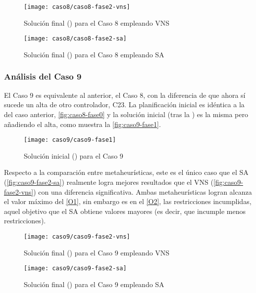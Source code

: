 \begin{figure}[!]
	\centering
	\texttt{[image: caso8/caso8-fase2-vns]}
	\caption{Solución final (\fasedos{}) para el Caso 8 empleando VNS}
	\label{fig:caso8-fase2-vns}
\end{figure}

\begin{figure}[!]
	\centering
	\texttt{[image: caso8/caso8-fase2-sa]}
	\caption{Solución final (\fasedos{}) para el Caso 8 empleando SA}
	\label{fig:caso8-fase2-sa}
\end{figure}


\subsubsection{Análisis del Caso 9}

El Caso 9 es equivalente al anterior, el Caso 8, con la diferencia de que ahora sí sucede un alta de otro controlador, C23. La planificación inicial es idéntica a la del caso anterior, \autoref{fig:caso8-fase0} y la solución inicial (tras la \faseuno{}) es la misma pero añadiendo el alta, como muestra la \autoref{fig:caso9-fase1}.

\begin{figure}[!]
	\centering
	\texttt{[image: caso9/caso9-fase1]}
	\caption{Solución inicial (\faseuno{}) para el Caso 9}
	\label{fig:caso9-fase1}
\end{figure}

Respecto a la comparación entre metaheurísticas, este es el único caso que el SA (\autoref{fig:caso9-fase2-sa}) realmente logra mejores resultados que el VNS (\autoref{fig:caso9-fase2-vns}) con una diferencia significativa. Ambas metaheurísticas logran alcanza el valor máximo del \ref{O1}, sin embargo es en el \ref{O2}, las restricciones incumplidas, aquel objetivo que el SA obtiene valores mayores (es decir, que incumple menos restricciones).

\begin{figure}[!]
	\centering
	\texttt{[image: caso9/caso9-fase2-vns]}
	\caption{Solución final (\fasedos{}) para el Caso 9 empleando VNS}
	\label{fig:caso9-fase2-vns}
\end{figure}

\begin{figure}[!]
	\centering
	\texttt{[image: caso9/caso9-fase2-sa]}
	\caption{Solución final (\fasedos{}) para el Caso 9 empleando SA}
	\label{fig:caso9-fase2-sa}
\end{figure}

